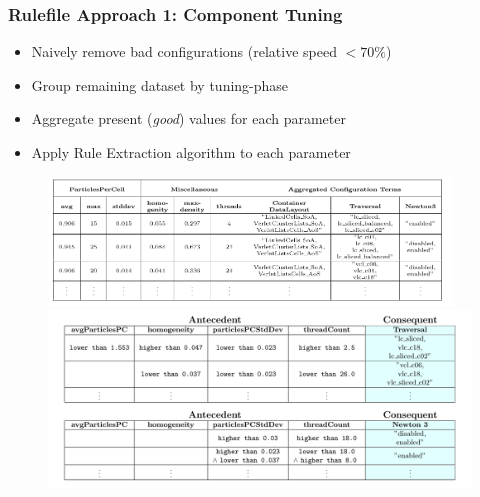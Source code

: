 \documentclass[
	10pt,
	t		%
]{beamer}
\begin{document}
\begin{frame}
	\frametitle{Rulefile Approach 1: Component Tuning}

	\begin{itemize}
		\item Naively remove bad configurations (relative speed $<70\%$)
		\item Group remaining dataset by tuning-phase
		\item Aggregate present (\textit{good}) values for each parameter
		\item Apply Rule Extraction algorithm to each parameter
	\end{itemize}

	\begin{figure}
		\centering
		\vspace{-0.1cm}
		\includegraphics[width=0.95\textwidth, trim={0 3.8cm 0 0},clip]{figures/aggregated-data-component.png}
		\includegraphics[width=1\textwidth, trim={0 8cm 0 0},clip]{figures/final-rules-component.png}
	\end{figure}
\end{frame}
\end{document}
